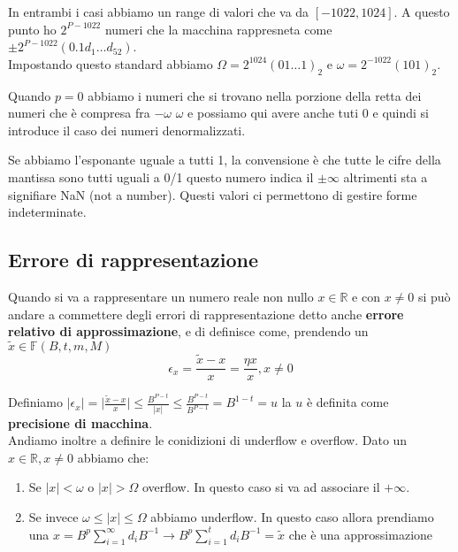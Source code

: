 \hspace{-15pt}In entrambi i casi abbiamo un range di valori che va da \([-1022, 1024]\). A questo punto ho \(2^{P-1022}\) numeri che la 
macchina rappresneta come \(\pm 2^{P - 1022}(0.1d_1 \dots d_{52})\).\\
Impostando questo standard abbiamo \(\Omega = 2^{1024}(01 \dots 1)_2\) e \(\omega = 2^{-1022} (101)_2\).\\

\begin{observation}
    Quando \(p=0\) abbiamo i numeri che si trovano nella porzione della retta dei numeri che è compresa fra \(-\omega\) \(\omega\)
    e possiamo qui avere anche tuti 0 e quindi si introduce il caso dei numeri denormalizzati.
\end{observation}

\hspace{-15pt}Se abbiamo l'esponante uguale a tutti 1, la convensione è che tutte le cifre della mantissa sono tutti uguali a 0/1
questo numero indica il \(\pm \infty\) altrimenti sta a signifiare NaN (not a number). Questi valori ci permettono di gestire
forme indeterminate.

\subsection{Errore di rappresentazione}
Quando si va a rappresentare un numero reale non nullo \(x \in \mathbb{R}\) e con \(x \neq 0\) si può andare a commettere degli 
errori di rappresentazione detto anche \textbf{errore relativo di approssimazione}, e di definisce come, prendendo un \(\tilde{x} \in \mathbb{F}(B, t, m, M)\)
\[\epsilon_x = \frac{\tilde{x} - x}{x} = \frac{\eta x}{x}, x \neq 0\]

\hspace{-15pt}Definiamo \(|\epsilon_x| = \big | \frac{\tilde{x} - x}{x}\big | \leq \frac{B^{P-t}}{| x|} \leq \frac{B^{P - t}}{B^{P - 1}} = B^{1 - t} = u\)
la \(u\) è definita come \textbf{precisione di macchina}.\\

\hspace{-15pt}Andiamo inoltre a definire le conidizioni di underflow e overflow. Dato un \(x \in \mathbb{R}, x \neq 0\) abbiamo che:
\begin{enumerate}
    \item Se \(|x| < \omega\) o \(|x| > \Omega\) overflow. In questo caso si va ad associare il \(+\infty\).
    \item Se invece \(\omega \leq |x| \leq \Omega\) abbiamo underflow. In questo caso allora prendiamo una \(x = B^p \sum_{i = 1}^{\infty}d_i B^{-1}
    \longrightarrow B^p \sum_{i=1}^{t}d_i B^{-1} = \tilde{x}\) che è una approssimazione 
\end{enumerate}

